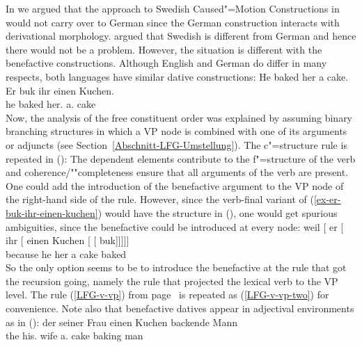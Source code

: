 In \citet{MWArgSt} we argued that the approach to Swedish Caused"=Motion Constructions in
\citet{ADT2008a,ADT2013a} would not carry over to German since the German construction interacts with derivational
morphology. \citet{AT2014a} argued that Swedish is different from German and hence there would not
be a problem. However, the situation is different with the benefactive constructions. Although
English and German do differ in many respects, both languages have similar dative constructions:
\eal
\ex He baked her a cake.
\ex
\label{ex-er-buk-ihr-einen-kuchen} 
\gll Er buk   ihr        einen Kuchen.\\
     he baked her.\dat{} a.\acc{} cake\\
\zl
Now, the analysis of the free constituent order was explained by assuming binary branching
structures in which a VP node is combined with one of its arguments or adjuncts (see
Section~\ref{Abschnitt-LFG-Umstellung}). The c"=structure rule is repeated in ():
\ea
\label{lfg-vp-regel-two}
\z
The dependent elements contribute to the f"=structure of the verb and coherence/""completeness ensure that all
arguments of the verb are present. One could add the introduction of the benefactive argument to
the VP node of the right-hand side of the rule. However, since the verb-final variant of
(\ref{ex-er-buk-ihr-einen-kuchen}) would have the structure in (), one would get spurious
ambiguities, since the benefactive could be introduced at every node:
\ea
\gll weil    [ er [ ihr [ einen Kuchen [ [ buk]]]]]\\
     because {}        he {}        her {}        a cake       {}        {}       baked\\
\z
So the only option seems to be to introduce the benefactive at the rule that got the recursion
going, namely the rule that projected the lexical verb to the VP level. The rule (\ref{LFG-v-vp})
from page~\pageref{LFG-v-vp} is repeated as (\ref{LFG-v-vp-two}) for convenience.
\ea
\label{LFG-v-vp-two}
\z
Note also that benefactive datives appear in adjectival environments as in ():
\eal
\ex
\gll der seiner Frau einen Kuchen backende Mann\\
     the his.\dat{} wife a.\acc{} cake baking man\\
